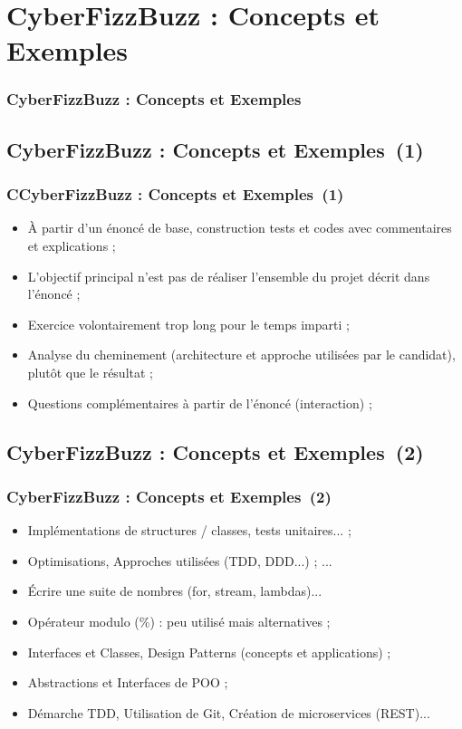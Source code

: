 \documentclass{beamer}
\begin{document}
\def\titleExemplesCyberFizzBuzz{CyberFizzBuzz : Concepts et Exemples}
\section{\titleExemplesCyberFizzBuzz }
\begin{frame}
	\frametitle{\titleExemplesCyberFizzBuzz }
	\tableofcontents[sections=3,currentsection,subsectionstyle=show/shaded/hide]
\end{frame} 

\subsection{\titleExemplesCyberFizzBuzz ~(1)}
\begin{frame}
	\frametitle{C\titleExemplesCyberFizzBuzz ~(1)}
	\begin{itemize}
		\item {\`A} partir d'un {\'e}nonc{\'e} de base, construction tests et codes avec commentaires et explications ; 
		\item L'objectif principal n'est pas de r{\'e}aliser l'ensemble du projet d{\'e}crit dans l'{\'e}nonc{\'e} ; 
		\item Exercice volontairement trop long pour le temps imparti ; 
		\item Analyse du cheminement (architecture et approche utilis{\'e}es par le candidat), plut{\^o}t que le r{\'e}sultat ;
		\item Questions compl{\'e}mentaires {\`a} partir de l'{\'e}nonc{\'e} (interaction) ; 
	\end{itemize}
\end{frame} 

\subsection{\titleExemplesCyberFizzBuzz ~(2)}
\begin{frame}
	\frametitle{\titleExemplesCyberFizzBuzz ~(2)}
	\begin{itemize}
		\item Impl{\'e}mentations de structures / classes, tests unitaires... ;
		\item Optimisations, Approches utilis{\'e}es (TDD, DDD...) ; ... 
		\item {\'E}crire une suite de nombres (for, stream, lambdas)...
		\item Op{\'e}rateur modulo (\%) : peu utilis{\'e} mais alternatives ; 
		\item Interfaces et Classes, Design Patterns (concepts et applications) ; 
		\item Abstractions et Interfaces de POO ; 
		\item D{\'e}marche TDD, Utilisation de Git, Cr{\'e}ation de microservices (REST)...
	\end{itemize}
\end{frame} 
\end{document}
